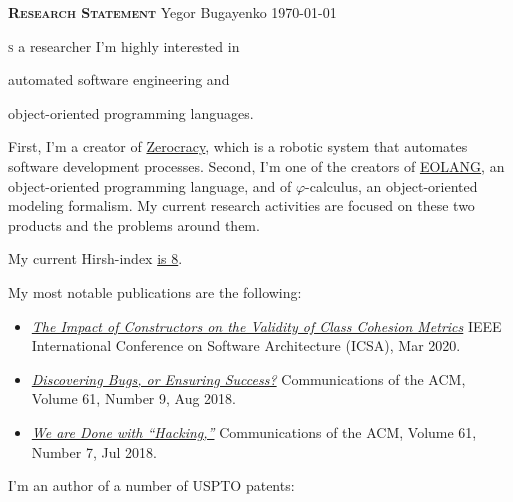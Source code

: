 \documentclass{./yb}
\newcommand\first[2]{\vspace{1em}{\setlength{\parindent}{0pt}\bfseries\LARGE #1}\textsc{#2}}
\begin{document}
\small

{\bfseries\scshape Research Statement}\newline
Yegor Bugayenko\newline
\today

\vspace*{12pt}

\first{A}{s} a researcher I'm highly interested in \begin{inparaenum}[a)]
\item automated software engineering and
\item object-oriented programming languages.
\end{inparaenum}
First, I'm a creator of \href{https://www.zerocracy.com}{Zerocracy}, which is a robotic system
that automates software development processes.
Second, I'm one of the creators of \href{https://www.eolang.org}{EOLANG}, an object-oriented programming
language, and of \(\varphi\)-calculus, an object-oriented modeling formalism.
My current research activities are focused on these two products and the
problems around them.

My current Hirsh-index \href{https://scholar.google.com/citations?user=cYmXh60AAAAJ}{is 8}.

My most notable publications are the following:

\begin{itemize}
\setlength\itemsep{-.4em}
\item \emph{\href{https://www.yegor256.com/pdf/2020/icsa20.pdf}{The Impact of Constructors on the Validity of Class Cohesion Metrics}}\newline
IEEE International Conference on Software Architecture (ICSA), Mar 2020.
\item \emph{\href{https://www.yegor256.com/pdf/2018/discovering-bugs.pdf}{Discovering Bugs, or Ensuring Success?}}\newline
Communications of the ACM, Volume 61, Number 9, Aug 2018.
\item \emph{\href{https://www.yegor256.com/pdf/2018/we-are-done-with-hacking.pdf}{We are Done with ``Hacking,''}}\newline
Communications of the ACM, Volume 61, Number 7, Jul 2018.
\end{itemize}

I'm an author of a number of USPTO patents:
\end{document}

